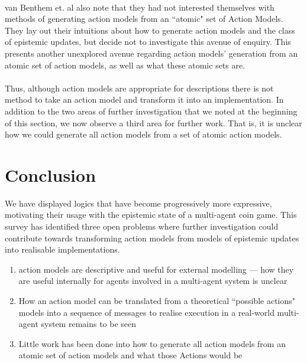 \documentclass[12pt, a4paper, titlepage]{scrartcl}
\begin{document}
\\
van Benthem et. al also note that they had not interested themselves with methods of
generating action models from an ``atomic" set of Action
Models\cite{benthem2006lcc}.
They lay out their intuitions about how to generate action models and the class
of epistemic updates, but decide not to investigate this avenue of enquiry.
This presents another unexplored avenue regarding action models' generation from
an atomic set of action models, as well as what these atomic sets are.\\
\\
Thus, although action models are appropriate for descriptions there is not
method to take an action model and transform it into an implementation.
In addition to the two areas of further investigation that we noted at the
beginning of this section, we now observe a third area for further work.
That is, it is unclear how we could generate all action models from a
set of atomic action models.

\section{Conclusion} \label{conc}
We have displayed logics that have become progressively more expressive,
motivating their usage with the epistemic state of a multi-agent coin game.
This survey has identified three open problems where further investigation could contribute towards
transforming action models from models of epistemic updates into realisable
implementations.
\begin{enumerate}
	\item action models are descriptive and useful for external modelling --- how
	they are useful internally for agents involved in a multi-agent system is
	unclear
	\item How an action model can be translated from a theoretical ``possible
	actions" models into a sequence of messages to realise execution in a
	real-world multi-agent system remains to be seen
	\item Little work has been done into how to generate all action models from
	an atomic set of action models and what those Actions would be
\end{enumerate}



\end{document}
